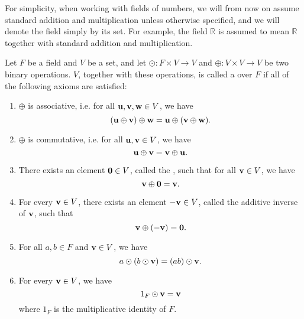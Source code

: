 For simplicity, when working with fields of numbers, we will from now on assume standard addition and multiplication unless otherwise specified, and we will denote the field simply by its set. For example, the field $ \mathbb{R} $ is assumed to mean $ \mathbb{R} $ together with standard addition and multiplication.

\begin{defn}
Let $ F $ be a field and $ V $ be a set, and let $ \odot:F\times V\to V $ and $ \oplus:V\times V\to V $ be two binary operations. $ V $, together with these operations, is called a  over $ F $ if all of the following axioms are satisfied:
\begin{enumerate}
    \item $ \oplus $ is associative, i.e. for all $ \boldsymbol{\mathbf{u}},\boldsymbol{\mathbf{v}},\boldsymbol{\mathbf{w}}\in V $, we have
    \begin{equation*}
        (\boldsymbol{\mathbf{u}}\oplus\boldsymbol{\mathbf{v}})\oplus\boldsymbol{\mathbf{w}}=\boldsymbol{\mathbf{u}}\oplus(\boldsymbol{\mathbf{v}}\oplus\boldsymbol{\mathbf{w}}).
    \end{equation*}

    \item $ \oplus $ is commutative, i.e. for all $ \boldsymbol{\mathbf{u}},\boldsymbol{\mathbf{v}}\in V $, we have
    \begin{equation*}
        \boldsymbol{\mathbf{u}}\oplus\boldsymbol{\mathbf{v}}=\boldsymbol{\mathbf{v}}\oplus\boldsymbol{\mathbf{u}}.
    \end{equation*}

    \item There exists an element $ \boldsymbol{\mathbf{0}}\in V $, called the , such that for all $ \boldsymbol{\mathbf{v}}\in V $, we have
    \begin{equation*}
        \boldsymbol{\mathbf{v}}\oplus\boldsymbol{\mathbf{0}}=\boldsymbol{\mathbf{v}}.
    \end{equation*}

    \item For every $ \boldsymbol{\mathbf{v}}\in V $, there exists an element $ -\boldsymbol{\mathbf{v}}\in V $\!, called the additive inverse of $ \boldsymbol{\mathbf{v}} $, such that
    \begin{equation*}
        \boldsymbol{\mathbf{v}}\oplus(-\boldsymbol{\mathbf{v}})=\boldsymbol{\mathbf{0}}.
    \end{equation*}

    \item For all $ a,b\in F $ and $ \boldsymbol{\mathbf{v}}\in V $, we have
    \begin{equation*}
        a\odot (b\odot\boldsymbol{\mathbf{v}})=(ab)\odot\boldsymbol{\mathbf{v}}.
    \end{equation*}

    \item For every $ \boldsymbol{\mathbf{v}}\in V $, we have
    \begin{equation*}
        1_F\odot\boldsymbol{\mathbf{v}}=\boldsymbol{\mathbf{v}}
    \end{equation*}
    where $ 1_F $ is the multiplicative identity of $ F $.


\end{enumerate}
\end{defn}
